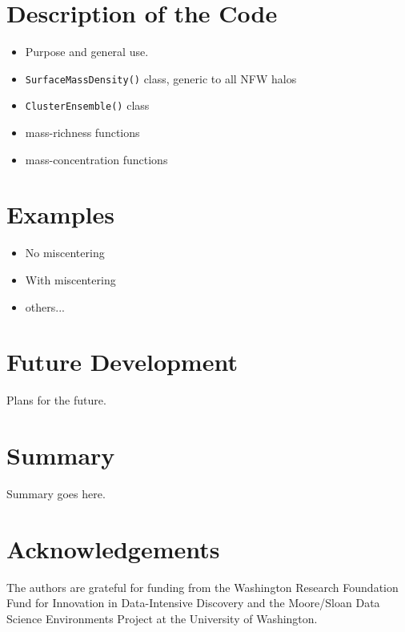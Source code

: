 \documentclass{emulateapj}
\begin{document}
\section{Description of the Code}
\label{code}

\begin{itemize} \itemsep -2pt
\item Purpose and general use.
\item \lstinline{SurfaceMassDensity()} class, generic to all NFW halos
\item \lstinline{ClusterEnsemble()} class
\item mass-richness functions
\item mass-concentration functions
\end{itemize}

\section{Examples}
\label{ex}

\begin{itemize} \itemsep -2pt
\item No miscentering
\item With miscentering
\item others...
\end{itemize}

\section{Future Development}
\label{future}

Plans for the future.

\section{Summary}
\label{summary}

Summary goes here.


\section*{Acknowledgements}
The authors are grateful for funding from the Washington Research Foundation Fund for Innovation in Data-Intensive Discovery and the Moore/Sloan Data Science Environments Project at the University of Washington.




\end{document}
